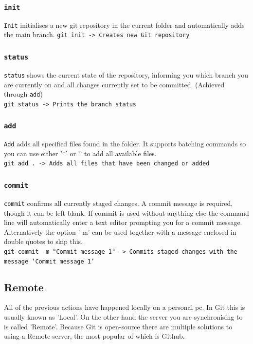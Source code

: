 \documentclass{article}
\begin{document}
	\subsubsection{\texttt{init}}
	\texttt{Init} initialises a new git repository in the current folder and automatically adds the main branch.
	\texttt{git init -> Creates new Git repository}
	\subsubsection{\texttt{status}}
	\texttt{status} shows the current state of the repository, informing you which branch you are currently on and all changes currently set to be committed. (Achieved through \texttt{add}) \\
	\texttt{git status -> Prints the branch status}
	\subsubsection{\texttt{add}}
	\texttt{Add} adds all specified files found in the folder. It supports batching commands so you can use either '*' or '.' to add all available files. \\
	\texttt{git add . -> Adds all files that have been changed or added}
	\subsubsection{\texttt{commit}}
	\texttt{commit} confirms all currently staged changes. A commit message is required, though it can be left blank. If commit is used without anything else the command line will automatically enter a text editor prompting you for a commit message. Alternatively the option '-m' can be used together with a message enclosed in double quotes to skip this. \\
	\texttt{git commit -m "Commit message 1" -> Commits staged changes with the message 'Commit message 1'}
	\subsection{Remote}
	All of the previous actions have happened locally on a personal pc. In Git this is usually known as 'Local'. On the other hand the server you are synchronising to is called 'Remote'. Because Git is open-source there are multiple solutions to using a Remote server, the most popular of which is Github.
\end{document}
